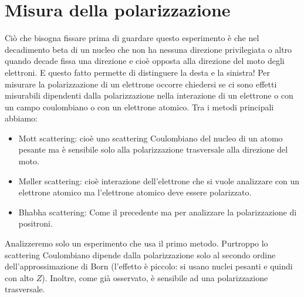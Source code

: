 \section{Misura della polarizzazione}
Ciò che bisogna fissare prima di guardare questo esperimento è che nel decadimento beta di un nucleo che non ha nessuna direzione privilegiata o altro quando decade fissa una direzione e cioè opposta alla direzione del moto degli elettroni. E questo fatto permette di distinguere la desta e la sinistra! Per misurare la polarizzazione di un elettrone occorre chiedersi se ci sono effetti misurabili dipendenti dalla polarizzazione nella interazione di un elettrone o con un campo coulombiano o con un elettrone atomico. Tra i metodi principali abbiamo:
\begin{itemize}
	\item Mott scattering: cioè uno scattering Coulombiano del nucleo di un atomo pesante ma è sensibile solo alla polarizzazione trasversale alla direzione del moto.
	\item M{\o}ller scattering: cioè interazione dell'elettrone che si vuole analizzare con un elettrone atomico ma l'elettrone atomico deve essere polarizzato.
	\item Bhabha scattering: Come il precedente ma per analizzare la polarizzazione di positroni. 
\end{itemize}
Analizzeremo solo un esperimento che usa il primo metodo. Purtroppo lo scattering Coulombiano dipende dalla polarizzazione solo al secondo ordine dell'approssimazione di Born (l'effetto è piccolo: si usano nuclei pesanti e quindi con alto $Z$). Inoltre, come già osservato, è sensibile ad una polarizzazione trasversale.
